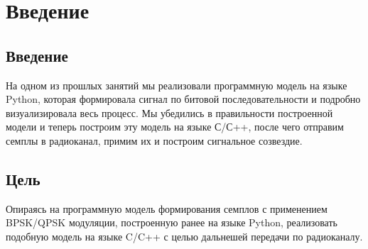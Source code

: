 \chapter{Введение}

\section{Введение}

На одном из прошлых занятий мы реализовали программную модель на языке Python, которая формировала сигнал по битовой 
последовательности и подробно визуализировала весь процесс. Мы убедились в правильности
построенной модели и теперь построим эту модель на языке С/С++, после чего отправим семплы в радиоканал, примим их и построим сигнальное
созвездие.

\section{Цель}

Опираясь на программную модель формирования семплов с применением BPSK/QPSK модуляции, построенную ранее на языке Python, реализовать
подобную модель на языке C/C++ с целью дальнешей передачи по радиоканалу.


\endinput